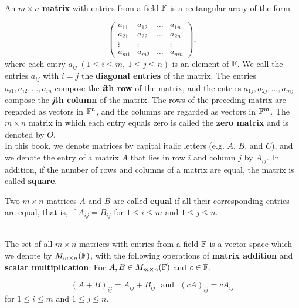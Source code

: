 \begin{definition}
	\hfill\\
	An $m \times n$ \textbf{matrix} with entries from a field $\mathbb{F}$ is a rectangular array of the form

	\[\begin{pmatrix}
			a_{11} & a_{12} & \dots & a_{1n} \\
			a_{21} & a_{22} & \dots & a_{2n} \\
			\vdots & \vdots &       & \vdots \\
			a_{m1} & a_{m2} & \dots & a_{mn}
		\end{pmatrix},\]
	where each entry $a_{ij}\ (1 \leq i \leq m,\ 1 \leq j \leq n)$ is an element of $\mathbb{F}$. We call the entries $a_{ij}$ with $i=j$ the \textbf{diagonal entries} of the matrix. The entries $a_{i1}, a_{i2}, \dots, a_{in}$ compose the \textbf{\textit{i}th row}  of the matrix, and the entries $a_{1j}, a_{2j}, \dots, a_{mj}$ compose the \textbf{\textit{j}th column} of the matrix. The rows of the preceding matrix are regarded as vectors in $\mathbb{F}^n$, and the columns are regarded as vectors in $\mathbb{F}^m$. The $m \times n$ matrix in which each entry equals zero is called the \textbf{zero matrix} and is denoted by $O$.\\

	In this book, we denote matrices by capital italic letters (e.g. $A$, $B$, and $C$), and we denote the entry of a matrix $A$ that lies in row $i$ and column $j$ by $A_{ij}$. In addition, if the number of rows and columns of a matrix are equal, the matrix is called \textbf{square}.

	Two $m \times n$ matrices $A$ and $B$ are called \textbf{equal} if all their corresponding entries are equal, that is, if $A_{ij} = B_{ij}$ for $1 \leq i \leq m$ and $1 \leq j \leq n$.
\end{definition}

\begin{definition}
	\hfill\\
	The set of all $m \times n$ matrices with entries from a field $\mathbb{F}$ is a vector space which we denote by $M_{m \times n}(\mathbb{F})$, with the following operations of \textbf{matrix addition} and \textbf{scalar multiplication}: For $A, B \in M_{m \times n}(\mathbb{F})$ and $c \in \mathbb{F}$,

	\[(A + B)_{ij} = A_{ij} + B_{ij}\ \ \ \text{and}\ \ \  (cA)_{ij} = cA_{ij}\]
	for $1 \leq i \leq m$ and $1 \leq j \leq n$.
\end{definition}

